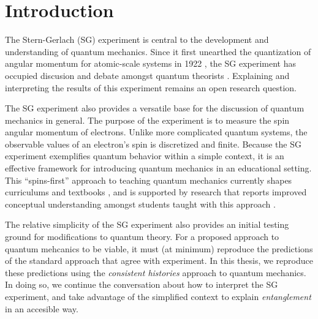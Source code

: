 %
%
%

\chapter{Introduction}

The Stern-Gerlach (SG) experiment is central to the development and understanding of quantum mechanics. Since it first unearthed the quantization of angular momentum for atomic-scale systems in 1922 \cite{stern}, the SG experiment has occupied discusion and debate amongst quantum theorists \cite{bocking}. Explaining and interpreting the results of this experiment remains an open research question.

The SG experiment also provides a versatile base for the discussion of quantum mechanics in general. The purpose of the experiment is to measure the spin angular momentum of electrons. Unlike more complicated quantum systems, the observable values of an electron's spin is discretized and finite. Because the SG experiment exemplifies quantum behavior within a simple context, it is an effective framework for introducing quantum mechanics in an educational setting. This ``spins-first'' approach to teaching quantum mechanics currently shapes curriculums \cite{gire} and textbooks \cite{mcintyre}, and is supported by research that reports improved conceptual understanding amongst students taught with this approach \cite{Sadaghiani}.

The relative simplicity of the SG experiment also provides an initial testing ground for modifications to quantum theory. For a proposed approach to quantum mehcanics to be viable, it must (at minimum) reproduce the predictions of the standard approach that agree with experiment. In this thesis, we reproduce these predictions using the \textit{consistent histories} approach to quantum mechanics. In doing so, we continue the conversation about how to interpret the SG experiment, and take advantage of the simplified context to explain \textit{entanglement} in an accesible way.

